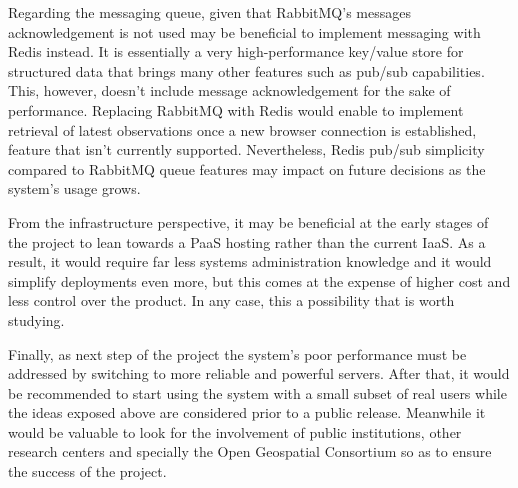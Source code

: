 Regarding the messaging queue, given that RabbitMQ's messages acknowledgement is not used may be beneficial to implement messaging with Redis instead. It is essentially a very high-performance key/value store for structured data that brings many other features such as pub/sub capabilities. This, however, doesn't include message acknowledgement for the sake of performance. Replacing RabbitMQ with Redis would enable to implement retrieval of latest observations once a new browser connection is established, feature that isn't currently supported. Nevertheless, Redis pub/sub simplicity compared to RabbitMQ queue features may impact on future decisions as the system's usage grows.

From the infrastructure perspective, it may be beneficial at the early stages of the project to lean towards a PaaS hosting rather than the current IaaS. As a result, it would require far less systems administration knowledge and it would simplify deployments even more, but this comes at the expense of higher cost and less control over the product. In any case, this a possibility that is worth studying.

Finally, as next step of the project the system's poor performance must be addressed by switching to more reliable and powerful servers. After that, it would be recommended to start using the system with a small subset of real users while the ideas exposed above are considered prior to a public release. Meanwhile it would be valuable to look for the involvement of public institutions, other research centers and specially the Open Geospatial Consortium so as to ensure the success of the project.